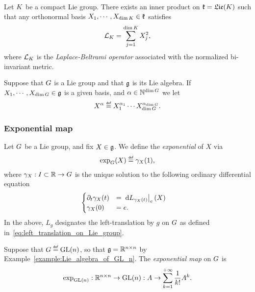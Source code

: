 \begin{lemma}
    Let $\CompactGroup$ be a compact Lie group.
    There exists an inner product on $\LieAlgebraCompactGroup = \Lie(\CompactGroup)$ such that
    any orthonormal basis $X_1, \cdots, X_{\dim \CompactGroup} \in \LieAlgebraCompactGroup$ satisfies
    \begin{align*}
        \Laplacian [\CompactGroup] = \sum_{j = 1}^{\dim \CompactGroup} X_j^2,
    \end{align*}
    where $\Laplacian [\CompactGroup]$ is
    the \emph{Laplace-Beltrami operator} associated with the normalized bi-invariant metric.
\end{lemma}

Suppose that $\Group$ is a Lie group
and that $\LieAlgebra$ is its Lie algebra.
If $X_1, \cdots, X_{\dim \Group} \in \LieAlgebra$ is a given basis,
and $\alpha \in \N^{\dim \Group}$
we let
\begin{align*}
    X^\alpha \defeq X_1^{\alpha_1} \cdots X_{\dim \Group}^{\alpha_{\dim \Group}}.
\end{align*}

\subsubsection{Exponential map}

\begin{definition}
    Let $\Group$ be a Lie group,
    and fix $X \in \LieAlgebra$.
    We define the \emph{exponential} of $X$ via
    \begin{align*}
        \exp_\Group(X) \defeq \gamma_X(1),
    \end{align*}
    where $\gamma_X : I \subset \R \to \Group$ is the unique solution to the following ordinary differential equation
    \begin{align*}
        \begin{cases}
            \D* 1 [\gamma_X] t(t) &= \eval{\dd L_{\gamma_X(t)}}{e}(X)\\
            \gamma_X(0) &= e.
        \end{cases}
        \quad
    \end{align*}
    In the above,
    $L_g$ designates the left-translation by $g$ on $\Group$
    as defined in~\eqref{eq:left_translation_on_Lie_group}.
\end{definition}

\begin{example}
    Suppose that $\Group \defeq \GeneralLinear n$,
    so that $\LieAlgebra = \SquareMatrices n$ by Example~\eqref{example:Lie_algebra_of_GL_n}.
    The \emph{exponential map} on $\Group$ is
    \begin{align}
        \exp_{\GeneralLinear n} : \SquareMatrices n \to \GeneralLinear n :
        A \to \sum_{k = 1}^{+\infty} \frac 1 {k!} A^k.
        \label{eq:definition_of_exponential_of_matrices}
    \end{align}
\end{example}

